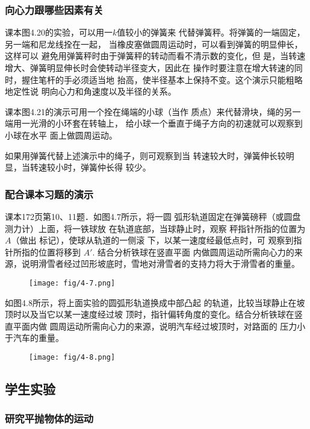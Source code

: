 \subsubsection{向心力跟哪些因素有关}
课本图4.20的实验，可以用一$k$值较小的弹簧来
代替弹簧秤。将弹簧的一端固定，另一端和尼龙线拴在一起，
当橡皮塞做圆周运动时，可以看到弹簧的明显伸长，这样可以
避免用弹簧秤时由于弹簧秤的转动而看不清示数的变化，但
是，当转速增大、弹簧明显伸长时会使转动半径变大，因此在
操作时要注意在增大转速的同时，握住笔杆的手必须适当地
抬高，使半径基本上保持不变。这个演示只能粗略地定性说
明向心力和角速度以及半径的关系。

课本图4.21的演示可用一个拴在绳端的小球（当作
质点）来代替滑块，绳的另一端用一光滑的小环套在转轴上，
给小球一个垂直于绳子方向的初速就可以观察到小球在水平
面上做圆周运动。

如果用弹簧代替上述演示中的绳子，则可观察到当
转速较大时，弹簧伸长较明显，当转速较小时，弹簧仲长得
较少。

\subsubsection{配合课本习题的演示}
课本172页第10、11题．如图4.7所示，将一圆
弧形轨道固定在弹簧磅秤（或圆盘测力计）上面，将一铁球放
在轨道底部，当球静止时，观察
秤指针所指的位置为$A$（做出
标记），使球从轨道的一侧滚
下，以某一速度经最低点时，可
观察到指针所指的位置将移到
$A'$. 结合分析铁球在竖直平面
内做圆周运动所需向心力的来
源，说明滑雪者经过凹形坡底时，雪地对滑雪者的支持力将大于滑雪者的重量。

\begin{figure}[htp]
    \centering
    \texttt{[image: fig/4-7.png]}
    \caption{}
\end{figure}

如图4.8所示，将上面实验的圆弧形轨道换成中部凸起
的轨道，比较当球静止在坡顶时以及当它以某一速度经过坡
顶时，指针偏转角度的变化。结合分析铁球在竖直平面内做
圆周运动所需向心力的来源，说明汽车经过坡顶时，对路面的
压力小于汽车的重量。


\begin{figure}[htp]
    \centering
    \texttt{[image: fig/4-8.png]}
    \caption{}
\end{figure}

\subsection{学生实验}
\subsubsection{研究平抛物体的运动}

